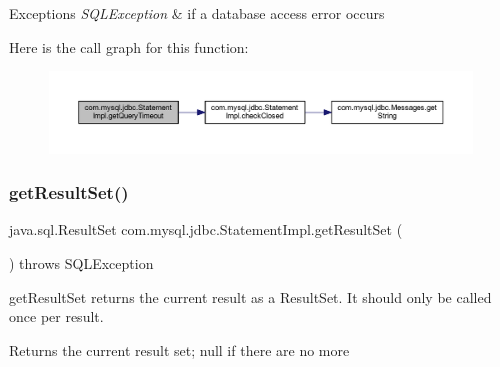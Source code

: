 \begin{DoxyExceptions}{Exceptions}
{\em S\+Q\+L\+Exception} & if a database access error occurs \\
\hline
\end{DoxyExceptions}
Here is the call graph for this function\+:
\nopagebreak
\begin{figure}[H]
\begin{center}
\leavevmode
\includegraphics[width=350pt]{classcom_1_1mysql_1_1jdbc_1_1_statement_impl_a7d917d5836a60a1e330f8c0674f551de_cgraph}
\end{center}
\end{figure}
\mbox{\label{classcom_1_1mysql_1_1jdbc_1_1_statement_impl_a0e97bb2074d21e45c4849e5c2b1dd0ef}} 
\subsubsection{\texorpdfstring{get\+Result\+Set()}{getResultSet()}}
{\footnotesize\ttfamily java.\+sql.\+Result\+Set com.\+mysql.\+jdbc.\+Statement\+Impl.\+get\+Result\+Set (\begin{DoxyParamCaption}{ }\end{DoxyParamCaption}) throws S\+Q\+L\+Exception}

get\+Result\+Set returns the current result as a Result\+Set. It should only be called once per result.

\begin{DoxyReturn}{Returns}
the current result set; null if there are no more
\end{DoxyReturn}

